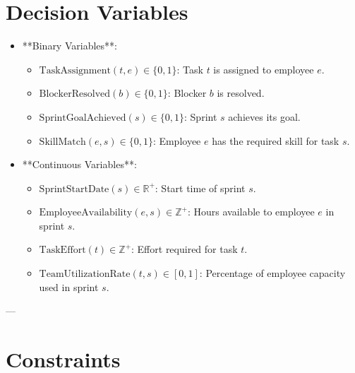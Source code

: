 \documentclass{article}
\begin{document}
\section{Decision Variables}
\begin{itemize}
    \item **Binary Variables**:
    \begin{itemize}
        \item $\text{TaskAssignment}(t, e) \in \{0,1\}$: Task $t$ is assigned to employee $e$.
        \item $\text{BlockerResolved}(b) \in \{0,1\}$: Blocker $b$ is resolved.
        \item $\text{SprintGoalAchieved}(s) \in \{0,1\}$: Sprint $s$ achieves its goal.
        \item $\text{SkillMatch}(e, s) \in \{0,1\}$: Employee $e$ has the required skill for task $s$.
    \end{itemize}
    \item **Continuous Variables**:
    \begin{itemize}
        \item $\text{SprintStartDate}(s) \in \mathbb{R}^+$: Start time of sprint $s$.
        \item $\text{EmployeeAvailability}(e, s) \in \mathbb{Z}^+$: Hours available to employee $e$ in sprint $s$.
        \item $\text{TaskEffort}(t) \in \mathbb{Z}^+$: Effort required for task $t$.
        \item $\text{TeamUtilizationRate}(t, s) \in [0,1]$: Percentage of employee capacity used in sprint $s$.
    \end{itemize}
\end{itemize}

---

\section{Constraints}
\end{document}

